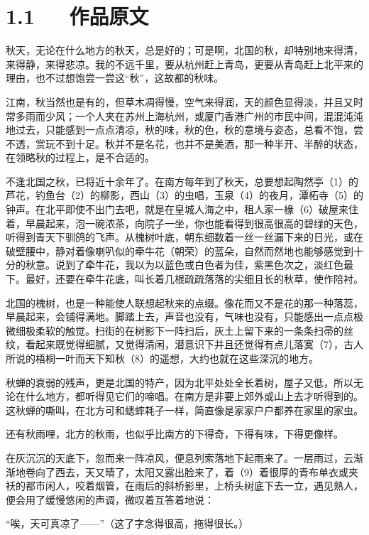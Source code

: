 \documentclass[letterpaper,10pt,english]{sphinxmanual}
\begin{document}
\section{1.1   作品原文}
\label{\detokenize{p01_u6563_u6587/_u90c1_u8fbe_u592b-_u53e4_u90fd_u7684_u79cb:id3}}
秋天，无论在什么地方的秋天，总是好的；可是啊，北国的秋，却特别地来得清，来得静，来得悲凉。我的不远千里，要从杭州赶上青岛，更要从青岛赶上北平来的理由，也不过想饱尝一尝这“秋”，这故都的秋味。

江南，秋当然也是有的，但草木凋得慢，空气来得润，天的颜色显得淡，并且又时常多雨而少风；一个人夹在苏州上海杭州，或厦门香港广州的市民中间，混混沌沌地过去，只能感到一点点清凉，秋的味，秋的色，秋的意境与姿态，总看不饱，尝不透，赏玩不到十足。秋并不是名花，也并不是美酒，那一种半开、半醉的状态，在领略秋的过程上，是不合适的。

不逢北国之秋，已将近十余年了。在南方每年到了秋天，总要想起陶然亭（1）的芦花，钓鱼台（2）的柳影，西山（3）的虫唱，玉泉（4）的夜月，潭柘寺（5）的钟声。在北平即使不出门去吧，就是在皇城人海之中，租人家一椽（6）破屋来住着，早晨起来，泡一碗浓茶，向院子一坐，你也能看得到很高很高的碧绿的天色，听得到青天下驯鸽的飞声。从槐树叶底，朝东细数着一丝一丝漏下来的日光，或在破壁腰中，静对着像喇叭似的牵牛花（朝荣）的蓝朵，自然而然地也能够感觉到十分的秋意。说到了牵牛花，我以为以蓝色或白色者为佳，紫黑色次之，淡红色最下。最好，还要在牵牛花底，叫长着几根疏疏落落的尖细且长的秋草，使作陪衬。

北国的槐树，也是一种能使人联想起秋来的点缀。像花而又不是花的那一种落蕊，早晨起来，会铺得满地。脚踏上去，声音也没有，气味也没有，只能感出一点点极微细极柔软的触觉。扫街的在树影下一阵扫后，灰土上留下来的一条条扫帚的丝纹，看起来既觉得细腻，又觉得清闲，潜意识下并且还觉得有点儿落寞（7），古人所说的梧桐一叶而天下知秋（8）的遥想，大约也就在这些深沉的地方。

秋蝉的衰弱的残声，更是北国的特产，因为北平处处全长着树，屋子又低，所以无论在什么地方，都听得见它们的啼唱。在南方是非要上郊外或山上去才听得到的。这秋蝉的嘶叫，在北方可和蟋蟀耗子一样，简直像是家家户户都养在家里的家虫。

还有秋雨哩，北方的秋雨，也似乎比南方的下得奇，下得有味，下得更像样。

在灰沉沉的天底下，忽而来一阵凉风，便息列索落地下起雨来了。一层雨过，云渐渐地卷向了西去，天又晴了，太阳又露出脸来了，着（9）着很厚的青布单衣或夹袄的都市闲人，咬着烟管，在雨后的斜桥影里，上桥头树底下去一立，遇见熟人，便会用了缓慢悠闲的声调，微叹着互答着地说：

“唉，天可真凉了——”（这了字念得很高，拖得很长。）
\end{document}
